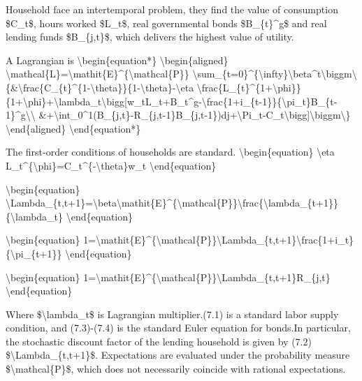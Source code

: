 \documentclass[10pt,math=newtx,citestyle=gb7714-2015,bibstyle=gb7714-2015]{elegantbook}
\begin{document}
	
	Household face an intertemporal problem, they find the value of consumption \$C\_t\$, hours worked \$L\_t\$,  real governmental bonds \$B\_\{t\}\^{}g\$ and real lending funds \$B\_\{j,t\}\$, which delivers the highest value of utility. 
	
	A Lagrangian is
	\textbackslash{}begin\{equation*\}
	\textbackslash{}begin\{aligned\}
	\textbackslash{}mathcal\{L\}=\textbackslash{}mathit\{E\}\^{}\{\textbackslash{}mathcal\{P\}\} \textbackslash{}sum\_\{t=0\}\^{}\{\textbackslash{}infty\}\textbackslash{}beta\^{}t\textbackslash{}biggm\textbackslash{}\{\&\textbackslash{}frac\{C\_\{t\}\^{}\{1-\textbackslash{}theta\}\}\{1-\textbackslash{}theta\}-\textbackslash{}eta \textbackslash{}frac\{L\_\{t\}\^{}\{1+\textbackslash{}phi\}\}\{1+\textbackslash{}phi\}+\textbackslash{}lambda\_t\textbackslash{}bigg[w\_tL\_t+B\_t\^{}g-\textbackslash{}frac\{1+i\_\{t-1\}\}\{\textbackslash{}pi\_t\}B\_\{t-1\}\^{}g\textbackslash{}\textbackslash{}
	\&+\textbackslash{}int\_0\^{}1(B\_\{j,t\}-R\_\{j,t-1\}B\_\{j,t-1\})dj+\textbackslash{}Pi\_t-C\_t\textbackslash{}bigg]\textbackslash{}biggm\textbackslash{}\}
	\textbackslash{}end\{aligned\}
	\textbackslash{}end\{equation*\}
	
	
	The first-order conditions of households are standard. 
	\textbackslash{}begin\{equation\}
	\textbackslash{}eta L\_t\^{}\{\textbackslash{}phi\}=C\_t\^{}\{-\textbackslash{}theta\}w\_t
	\textbackslash{}end\{equation\}
	
	\textbackslash{}begin\{equation\}
	\textbackslash{}Lambda\_\{t,t+1\}=\textbackslash{}beta\textbackslash{}mathit\{E\}\^{}\{\textbackslash{}mathcal\{P\}\}\textbackslash{}frac\{\textbackslash{}lambda\_\{t+1\}\}\{\textbackslash{}lambda\_t\}
	\textbackslash{}end\{equation\}
	
	\textbackslash{}begin\{equation\}
	1=\textbackslash{}mathit\{E\}\^{}\{\textbackslash{}mathcal\{P\}\}\textbackslash{}Lambda\_\{t,t+1\}\textbackslash{}frac\{1+i\_t\}\{\textbackslash{}pi\_\{t+1\}\}
	\textbackslash{}end\{equation\}
	
	\textbackslash{}begin\{equation\}
	1=\textbackslash{}mathit\{E\}\^{}\{\textbackslash{}mathcal\{P\}\}\textbackslash{}Lambda\_\{t,t+1\}R\_\{j,t\}
	\textbackslash{}end\{equation\}
	
	Where \$\textbackslash{}lambda\_t\$ is Lagrangian multiplier.(7.1) is a standard labor supply condition, and (7.3)-(7.4) is the standard Euler equation for bonds.In particular, the stochastic discount factor of the lending household is given by (7.2) \$\textbackslash{}Lambda\_\{t,t+1\}\$. Expectations are evaluated under the probability measure \$\textbackslash{}mathcal\{P\}\$, which does not necessarily coincide with rational expectations.
	
\end{document}
